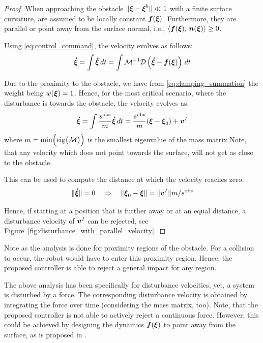 \begin{proof}
When approaching the obstacle $\| \boldsymbol{\xi} - \boldsymbol{\xi}^b \| \ll 1$ with a finite surface curvature, are assumed to be locally constant $\boldsymbol{f}(\boldsymbol{\xi})$. Furthermore, they are parallel or point away from the surface normal, i.e., $\left\langle {\boldsymbol{f}(\boldsymbol{\xi})}, \, {\boldsymbol{n}(\boldsymbol{\xi})} \right\rangle \geq 0$.

Using \eqref{eq:control_command}, the velocity evolves as follows:
\begin{equation}
    \boldsymbol{\dot \xi} = \int \boldsymbol{\ddot \xi} \, dt = \int \mathcal{M}^{-1} \mathcal{D}  
	\left( \boldsymbol{\dot \xi} - \boldsymbol{f}(\boldsymbol{\xi}) \right) \, dt
\end{equation}

Due to the proximity to the obstacle, we have from \eqref{eq:damping_summation} the weight being $w(\boldsymbol{\xi}) = 1$. Hence, for the most critical scenario, where the disturbance is towards the obstacle, the velocity evolves as:
\begin{equation}
    \vecs{\dot \xi} = \int \frac{s^{\mathrm{obs}}}{m} \vecs{\dot \xi} \, dt = \frac{s^{\mathrm{obs}}}{m} (\vecs{\xi} - \vecs \xi_0)  + \vecs v^I \label{eq:velocity_with_control}
\end{equation}
where $m = \min \Bigl(\text{eig} \bigl(\mathcal{M} \bigr) \Bigr)$ is the smallest eigenvalue of the mass matrix 
Note, that any velocity which does not point towards the surface, will not get as close to the obstacle.

This can be used to compute the distance at which the velocity reaches zero:
\begin{equation}
    \| \boldsymbol{\dot \xi} \| = 0
    \quad \Rightarrow \quad
    \|\boldsymbol{\xi}_0 - \boldsymbol{\xi} \| = \| \boldsymbol{v}^I \| {m} / {s^{\mathrm{obs}}} 
\end{equation}

Hence, if starting at a position that is further away or at an equal distance, a disturbance velocity of $\boldsymbol{v}^I$ can be rejected, see Figure~\ref{fig:disturbance_with_parallel_velocity}.
\end{proof}

Note as the analysis is done for proximity regions of the obstacle. For a collision to occur, the robot would have to enter this proximity region. Hence, the proposed controller is able to reject a general impact for any region.

The above analysis has been specifically for disturbance velocities, yet, a system is disturbed by a force. The corresponding disturbance velocity is obtained by integrating the force over time (considering the mass matrix, too). 
Note, that the proposed controller is not able to actively reject a continuous force. 
However, this could be achieved by designing the dynamics $\boldsymbol{f}(\boldsymbol{\xi})$ to point away from the surface, as is proposed in \cite{huber2023avoidance}.

